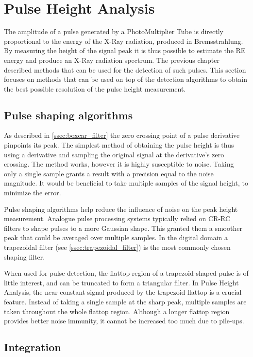 \section{Pulse Height Analysis}

The amplitude of a pulse generated by a PhotoMultiplier Tube
is directly proportional to the energy of the X-Ray radiation,
produced in Bremsstrahlung. By measuring the height of the signal peak 
it is thus possible to estimate the RE energy and
produce an X-Ray radiation spectrum. The previous chapter
described methods that can be used for the detection of such pulses.
This section focuses on methods that can be used on top of
the detection algorithms to obtain the best possible resolution 
of the pulse height measurement.

\subsection{Pulse shaping algorithms}
As described in \autoref{ssec:boxcar_filter} the zero crossing point 
of a pulse derivative pinpoints its peak.
The simplest method of obtaining the pulse height
is thus using a derivative and sampling the original signal
at the derivative's zero crossing.
The method works, however it is highly susceptible to noise.
Taking only a single sample grants a result with a precision 
equal to the noise magnitude. It would be beneficial
to take multiple samples of the signal height, to minimize 
the error.


Pulse shaping algorithms help reduce the influence of noise
on the peak height measurement. Analogue pulse processing 
systems typically relied on CR-RC filters to shape 
pulses to a more Gaussian shape. This granted them 
a smoother peak that could be averaged over multiple samples.
In the digital domain a trapezoidal filter 
(see \autoref{ssec:trapezoidal_filter})
is the most commonly chosen shaping filter.


When used for pulse detection, the flattop region of
a trapezoid-shaped pulse is of little interest, and 
can be truncated to form a triangular filter. In Pulse Height
Analysis, the near constant signal produced
by the trapezoid flattop is a crucial feature. 
Instead of taking a single sample at the sharp peak,
multiple samples are taken throughout the whole flattop region.
Although a longer flattop region provides better noise immunity, 
it cannot be increased too much due to pile-ups.

\newpage
\subsection{Integration}

